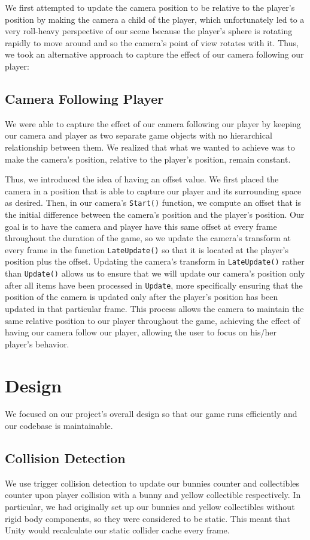 \documentclass[12pt]{article}
\begin{document}
  We first attempted to update the camera position to be relative to the player's position by making the camera a child of the player, which unfortunately led to a very roll-heavy perspective of our scene because the player's sphere is rotating rapidly to move around and so the camera's point of view rotates with it. Thus, we took an alternative approach to capture the effect of our camera following our player: 

\subsection{Camera Following Player}
  We were able to capture the effect of our camera following our player by keeping our camera and player as two separate game objects with no hierarchical relationship between them.
  We realized that what we wanted to achieve was to make the camera's position, relative to the player's position, remain constant. 

  Thus, we introduced the idea of having an offset value.
  We first placed the camera in a position that is able to capture our player and its surrounding space as desired. 
  Then, in our camera's \verb+Start()+ function, we compute an offset that is the initial difference between the camera's position and the player's position. 
  Our goal is to have the camera and player have this same offset at every frame throughout the duration of the game, so we update the camera's transform at every frame in the function \verb+LateUpdate()+ so that it is located at the player's position plus the offset. 
  Updating the camera's transform in \verb+LateUpdate()+ rather than \verb+Update()+ allows us to ensure that we will update our camera's position only after all items have been processed in \verb+Update+, more specifically ensuring that the position of the camera is updated only after the player's position has been updated in that particular frame.
  This process allows the camera to maintain the same relative position to our player throughout the game, achieving the effect of having our camera follow our player, allowing the user to focus on his/her player's behavior.
  

\section{Design}
  We focused on our project's overall design so that our game runs efficiently and our codebase is maintainable.

\subsection{Collision Detection}
  We use trigger collision detection to update our bunnies counter and collectibles counter upon player collision with a bunny and yellow collectible respectively.
  In particular, we had originally set up our bunnies and yellow collectibles without rigid body components, so they were considered to be static. This meant that Unity would recalculate our static collider cache every frame. 
\end{document}

